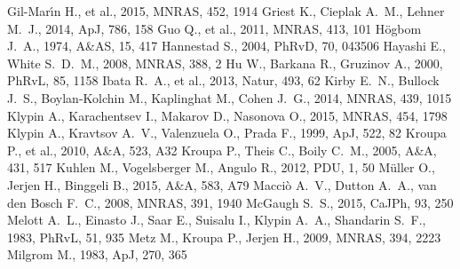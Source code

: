 \documentclass[a4wide,12pt]{book}
\begin{document}
{\begin{thebibliography}{}
 Gil-Mar{\'{\i}}n H., et al., 2015, MNRAS, 
452, 1914  
 Griest K., Cieplak A.~M., Lehner M.~J., 2014, ApJ, 786, 158
Guo Q., et al., 2011, MNRAS, 413, 101 
 H{\"o}gbom J.~A., 1974, A\&AS, 15, 417  
Hannestad S., 2004, PhRvD, 70, 043506 
 Hayashi E., White S.~D.~M., 2008, MNRAS, 388, 2 
 Hu W., Barkana R., Gruzinov A., 2000, PhRvL, 85, 1158 
Ibata R.~A., et al., 2013, Natur, 493, 62
Kirby E.~N., Bullock J.~S., Boylan-Kolchin M., Kaplinghat M., Cohen J.~G., 
2014, MNRAS, 439, 1015  
Klypin A., Karachentsev I., Makarov D., Nasonova O., 2015, MNRAS, 454, 1798 
Klypin A., Kravtsov A.~V., Valenzuela O., Prada F., 1999, ApJ, 522, 82 
 Kroupa P., et al., 2010, A\&A, 523, A32 
 Kroupa P., Theis C., Boily C.~M., 2005, A\&A, 431, 517 
 Kuhlen M., Vogelsberger M., Angulo R., 2012, PDU, 1, 50 
 M{\"u}ller O., Jerjen H., Binggeli B., 2015, A\&A, 583, A79 
 Macci{\`o} A.~V., Dutton A.~A., van den Bosch F.~C., 2008, MNRAS, 391, 1940 
McGaugh S.~S., 2015, CaJPh, 93, 250 
Melott A.~L., Einasto J., Saar E., Suisalu I., Klypin A.~A., Shandarin 
S.~F., 1983, PhRvL, 51, 935 
 Metz M., Kroupa P., Jerjen H., 2009, MNRAS, 394, 2223 
Milgrom M., 1983, ApJ, 270, 365 

\end{thebibliography}}
\end{document}
